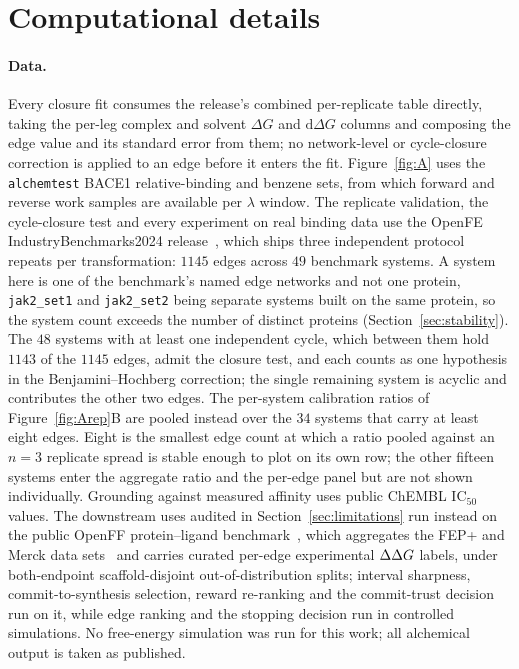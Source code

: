 \section{Computational details}\label{sec:methods}
\paragraph{Data.} Every closure fit consumes the release's combined per-replicate table directly,
taking the per-leg complex and solvent $\Delta G$ and $\mathrm{d}\Delta G$ columns and composing
the edge value and its standard error from them; no network-level or cycle-closure correction is
applied to an edge before it enters the fit. Figure~\ref{fig:A} uses the
\texttt{alchemtest} BACE1
relative-binding and benzene sets, from which forward and reverse work samples are available per
$\lambda$ window. The replicate validation, the cycle-closure test and every experiment on real
binding data use the OpenFE IndustryBenchmarks2024 release~\citep{baumann2025industrybenchmarks},
which ships three independent protocol repeats per transformation: $1145$ edges across $49$
benchmark systems. A system here is one of the benchmark's named edge networks and not one
protein, \texttt{jak2\_set1} and \texttt{jak2\_set2} being separate systems built on the same
protein, so the system count exceeds the number of distinct proteins
(Section~\ref{sec:stability}). The $48$ systems with at least one independent cycle, which between them hold $1143$ of the $1145$
edges, admit the closure test, and each counts as one hypothesis in the Benjamini--Hochberg
correction; the single remaining system is acyclic and contributes the other two edges. The
per-system calibration ratios of Figure~\ref{fig:Arep}B are pooled instead over the $34$ systems
that carry at least eight edges. Eight is the smallest edge count at which a ratio pooled against
an $n=3$ replicate spread is stable enough to plot on its own row; the other fifteen systems enter
the aggregate ratio and the per-edge panel but are not shown individually. Grounding
against measured affinity uses public ChEMBL $\mathrm{IC}_{50}$ values. The downstream uses
audited in Section~\ref{sec:limitations} run instead on the public OpenFF protein--ligand
benchmark~\citep{hahn2022plbench}, which aggregates the FEP+ and Merck data
sets~\citep{wang2015fep,schindler2020merck} and carries curated per-edge experimental $\Delta\Delta G$
labels, under both-endpoint scaffold-disjoint out-of-distribution splits; interval sharpness,
commit-to-synthesis selection, reward re-ranking and the commit-trust decision run on it, while
edge ranking and the stopping decision run in controlled simulations. No free-energy simulation
was run for this work; all alchemical output is taken as published.

